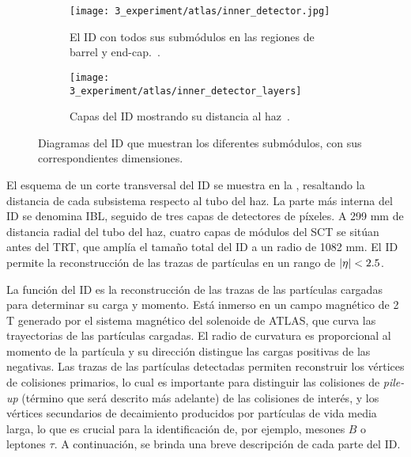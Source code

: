 \begin{figure}[ht!]
    \centering
    \begin{subfigure}[t]{0.49\linewidth}
        \centering
        \texttt{[image: 3\_experiment/atlas/inner\_detector.jpg]}
        \caption{El \ac{ID} con todos sus submódulos en las regiones de barrel y end-cap.~\cite{ATLAS-InnerDetector}.}
        \label{fig:atlas:atlas:atlas_inner_detector:general}
    \end{subfigure}
    \hfill
    \begin{subfigure}[t]{0.49\linewidth}
        \centering
        \texttt{[image: 3\_experiment/atlas/inner\_detector\_layers]}
        \caption{Capas del \ac{ID} mostrando su distancia al haz~\cite{ATLAS-InnerDetector}.}
        \label{fig:atlas:atlas:atlas_inner_detector:layer_radius}
    \end{subfigure}
    \caption{Diagramas del \ac{ID} que muestran los diferentes submódulos, con sus correspondientes dimensiones.}
    \label{fig:atlas:atlas:atlas_inner_detector}
\end{figure}

El esquema de un corte transversal del \acf{ID} \cite{ATLAS-ID-TDR} se muestra en la \Fig{\ref{fig:atlas:atlas:atlas_inner_detector}}, resaltando la distancia de cada subsistema respecto al tubo del haz. La parte más interna del \ac{ID} se denomina \ac{IBL}, seguido de tres capas de detectores de píxeles. A 299 mm de distancia radial del tubo del haz, cuatro capas de módulos del \ac{SCT} se sitúan antes del \ac{TRT}, que amplía el tamaño total del \ac{ID} a un radio de 1082 mm. El \ac{ID} permite la reconstrucción de las trazas de partículas en un rango de $|\eta| < 2.5$.


La función del \ac{ID} es la reconstrucci\'on de las trazas de las partículas cargadas para determinar su carga y momento. Está inmerso en un campo magnético de 2 T generado por el sistema magnético del solenoide de \ac{ATLAS}, que curva las trayectorias de las partículas cargadas. El radio de curvatura es proporcional al momento de la partícula y su dirección distingue las cargas positivas de las negativas. Las trazas de las partículas detectadas permiten reconstruir los vértices de colisiones primarios, lo cual es importante para distinguir las colisiones de \textit{pile-up} (t\'ermino que ser\'a descrito m\'as adelante) de las colisiones de interés, y los vértices secundarios de decaimiento producidos por partículas de vida media larga, lo que es crucial para la identificación de, por ejemplo, mesones \(B\) o leptones \(\tau\). A continuaci\'on, se brinda una breve descripci\'on de cada parte del \ac{ID}.


